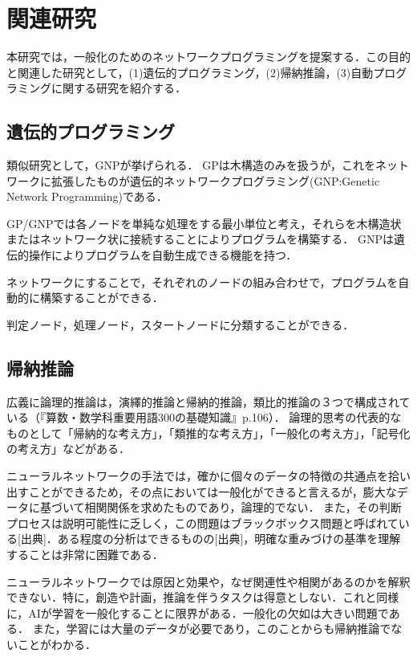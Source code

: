 \documentclass[exploratorypaper]{jsaiart} %
\begin{document}
\section{関連研究}
本研究では，一般化のためのネットワークプログラミングを提案する．この目的と関連した研究として，(1)遺伝的プログラミング，(2)帰納推論，(3)自動プログラミングに関する研究を紹介する．
\subsection{遺伝的プログラミング}
類似研究として，GNPが挙げられる．
GPは木構造のみを扱うが，これをネットワークに拡張したものが遺伝的ネットワークプログラミング(GNP:Genetic Network Programming)である\cite{gnp}．

GP/GNPでは各ノードを単純な処理をする最小単位と考え，それらを木構造状またはネットワーク状に接続することによりプログラムを構築する．
GNPは遺伝的操作によりプログラムを自動生成できる機能を持つ．

ネットワークにすることで，それぞれのノードの組み合わせで，プログラムを自動的に構築することができる．

判定ノード，処理ノード，スタートノードに分類することができる．

\subsection{帰納推論}
広義に論理的推論は，演繹的推論と帰納的推論，類比的推論の３つで構成されている（『算数・数学科重要用語300の基礎知識』p.106）．
論理的思考の代表的なものとして「帰納的な考え方」，「類推的な考え方」，「一般化の考え方」，「記号化の考え方」などがある\cite{saito:11}．

ニューラルネットワークの手法では，確かに個々のデータの特徴の共通点を拾い出すことができるため，その点においては一般化ができると言えるが，膨大なデータに基づいて相関関係を求めたものであり，論理的でない．
また，その判断プロセスは説明可能性に乏しく，この問題はブラックボックス問題と呼ばれている[出典]．ある程度の分析はできるものの[出典]，明確な重みづけの基準を理解することは非常に困難である．

ニューラルネットワークでは原因と効果や，なぜ関連性や相関があるのかを解釈できない．特に，創造や計画，推論を伴うタスクは得意としない．これと同様に，AIが学習を一般化することに限界がある．一般化の欠如は大きい問題である．
また，学習には大量のデータが必要であり，このことからも帰納推論でないことがわかる．
\end{document}
